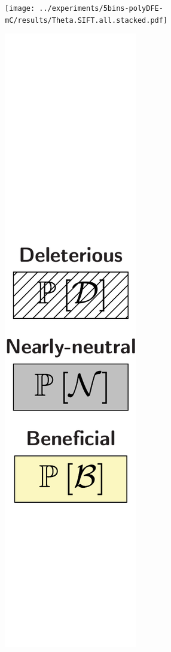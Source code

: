 \documentclass{article}
\begin{document}
    \begin{center}
        \begin{minipage}{0.9\linewidth}
            \texttt{[image: ../experiments/5bins-polyDFE-mC/results/Theta.SIFT.all.stacked.pdf]}
        \end{minipage}
        \begin{minipage}{0.09\linewidth}
            \includegraphics[width=\linewidth, page=1]{artworks/legend.polycat}

\end{minipage}
\end{center}
\end{document}
